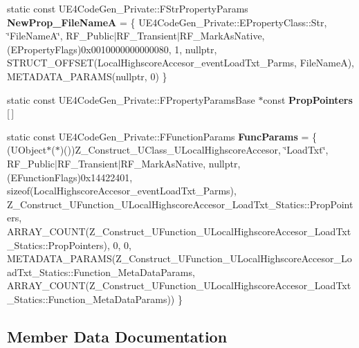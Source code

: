 \begin{DoxyCompactItemize}
\item 
\mbox{\label{struct_z___construct___u_function___u_local_highscore_accesor___load_txt___statics_a8be4de48a6f3b0fc5360a87444b1fec8}} 
static const U\+E4\+Code\+Gen\+\_\+\+Private\+::\+F\+Str\+Property\+Params {\bfseries New\+Prop\+\_\+\+File\+NameA} = \{ U\+E4\+Code\+Gen\+\_\+\+Private\+::\+E\+Property\+Class\+::\+Str, \char`\"{}File\+NameA\char`\"{}, R\+F\+\_\+\+Public$\vert$R\+F\+\_\+\+Transient$\vert$R\+F\+\_\+\+Mark\+As\+Native, (E\+Property\+Flags)0x0010000000000080, 1, nullptr, S\+T\+R\+U\+C\+T\+\_\+\+O\+F\+F\+S\+E\+T(\+Local\+Highscore\+Accesor\+\_\+event\+Load\+Txt\+\_\+\+Parms, File\+Name\+A), M\+E\+T\+A\+D\+A\+T\+A\+\_\+\+P\+A\+R\+A\+M\+S(nullptr, 0) \}
\item 
static const U\+E4\+Code\+Gen\+\_\+\+Private\+::\+F\+Property\+Params\+Base $\ast$const {\bfseries Prop\+Pointers} \mbox{[}$\,$\mbox{]}
\item 
\mbox{\label{struct_z___construct___u_function___u_local_highscore_accesor___load_txt___statics_a378976c46f978fbccfb984a383520aeb}} 
static const U\+E4\+Code\+Gen\+\_\+\+Private\+::\+F\+Function\+Params {\bfseries Func\+Params} = \{ (U\+Object$\ast$($\ast$)())Z\+\_\+\+Construct\+\_\+\+U\+Class\+\_\+\+U\+Local\+Highscore\+Accesor, \char`\"{}Load\+Txt\char`\"{}, R\+F\+\_\+\+Public$\vert$R\+F\+\_\+\+Transient$\vert$R\+F\+\_\+\+Mark\+As\+Native, nullptr, (E\+Function\+Flags)0x14422401, sizeof(\+Local\+Highscore\+Accesor\+\_\+event\+Load\+Txt\+\_\+\+Parms), Z\+\_\+\+Construct\+\_\+\+U\+Function\+\_\+\+U\+Local\+Highscore\+Accesor\+\_\+\+Load\+Txt\+\_\+\+Statics\+::\+Prop\+Pointers, A\+R\+R\+A\+Y\+\_\+\+C\+O\+U\+N\+T(\+Z\+\_\+\+Construct\+\_\+\+U\+Function\+\_\+\+U\+Local\+Highscore\+Accesor\+\_\+\+Load\+Txt\+\_\+\+Statics\+::\+Prop\+Pointers), 0, 0, M\+E\+T\+A\+D\+A\+T\+A\+\_\+\+P\+A\+R\+A\+M\+S(\+Z\+\_\+\+Construct\+\_\+\+U\+Function\+\_\+\+U\+Local\+Highscore\+Accesor\+\_\+\+Load\+Txt\+\_\+\+Statics\+::\+Function\+\_\+\+Meta\+Data\+Params, A\+R\+R\+A\+Y\+\_\+\+C\+O\+U\+N\+T(\+Z\+\_\+\+Construct\+\_\+\+U\+Function\+\_\+\+U\+Local\+Highscore\+Accesor\+\_\+\+Load\+Txt\+\_\+\+Statics\+::\+Function\+\_\+\+Meta\+Data\+Params)) \}
\end{DoxyCompactItemize}


\subsection{Member Data Documentation}
\mbox{\label{struct_z___construct___u_function___u_local_highscore_accesor___load_txt___statics_ab9a9b84adddafd75a12eca783668372d}} 
